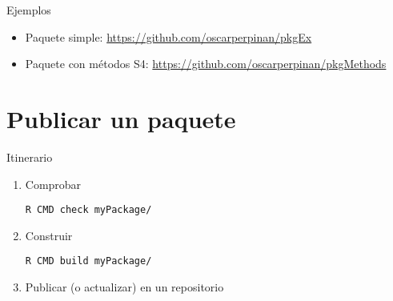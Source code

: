 \documentclass[xcolor={usenames,svgnames,dvipsnames}]{beamer}
\begin{document}
\begin{frame}[label={sec:orgd2d4def}]{Ejemplos}
\begin{itemize}
\item Paquete simple: \url{https://github.com/oscarperpinan/pkgEx}
\item Paquete con métodos S4: \url{https://github.com/oscarperpinan/pkgMethods}
\end{itemize}
\end{frame}

\section{Publicar un paquete}
\label{sec:orgf4458ea}

\begin{frame}[label={sec:orgf574bd1},fragile]{Itinerario}
 \begin{enumerate}
\item Comprobar
\lstset{language=sh,label= ,caption= ,captionpos=b,numbers=none}
\begin{lstlisting}
R CMD check myPackage/
\end{lstlisting}
\item Construir
\lstset{language=sh,label= ,caption= ,captionpos=b,numbers=none}
\begin{lstlisting}
R CMD build myPackage/
\end{lstlisting}
\item Publicar (o actualizar) en un repositorio
\end{enumerate}
\end{frame}
\end{document}
